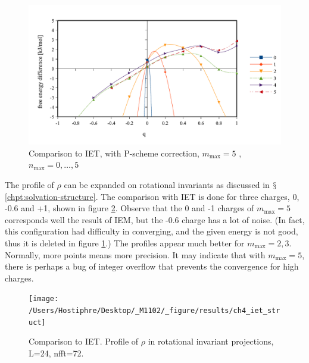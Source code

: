 \begin{figure}[H]
\begin{centering}
\includegraphics[bb=0bp 20bp 510bp 263bp,scale=0.6]{_figure/results/ch4_diff_mmax5}
\par\end{centering}
\caption{Comparison to IET, with P-scheme correction, $m_{\max}=5$ , $n_{\max}=0,\ldots,5$
\label{fig:Comparison-to-IET,nmax0-5}}
\end{figure}

The profile of $\rho$ can be expanded on rotational invariants as 
discussed in $\mathsection$\ref{chpt:solvation-structure}. The
comparison with IET is done for three charges, 0, -0.6 and +1, shown %
in figure \ref{fig:Comparison-to-IET.rot_invar}. Observe that the 0
and -1 charges of $m_{\max}=5$ corresponds well the result of IEM, but
the -0.6 charge has a lot of noise. (In fact, this configuration had
difficulty in converging, and the given energy is not good, thus it
is deleted in figure \ref{fig:Comparison-to-IET,nmax0-5}.) The
profiles appear much better for $m_{\max}=2,3$. Normally, more points
means more precision. It may indicate that with $m_{\max}=5$, there
is perhaps a bug of integer overflow that prevents the convergence
for high charges.

\begin{figure}[H]
\begin{centering}
\texttt{[image: /Users/Hostiphre/Desktop/\_M1102/\_figure/results/ch4\_iet\_struct]}
\par\end{centering}
\caption{Comparison to IET. Profile of $\rho$ in rotational invariant projections,
L=24, nfft=72.\label{fig:Comparison-to-IET.rot_invar}}
\end{figure}


